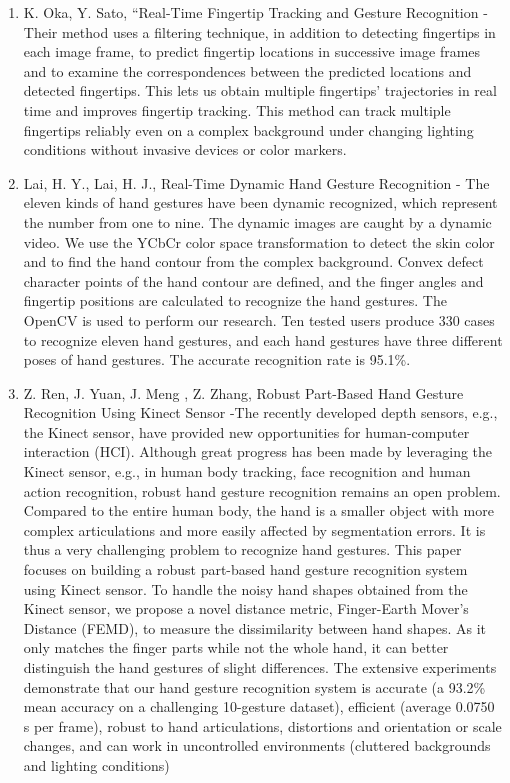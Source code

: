 \documentclass[11pt]{report}
\begin{document}
\begin{enumerate}
    \item K. Oka, Y. Sato, “Real-Time Fingertip Tracking and Gesture Recognition - Their method uses a filtering technique, in addition to detecting fingertips  in  each  image  frame,  to predict fingertip locations in successive image frames and to examine the correspondences between the predicted locations and detected fingertips. This lets us obtain multiple fingertips’ trajectories in real time and improves fingertip tracking. This method can track multiple fingertips reliably even on a complex background under changing lighting conditions without invasive devices or color markers. \cite{1}
    
    \item Lai, H. Y., Lai, H. J., Real-Time Dynamic Hand Gesture Recognition - The  eleven  kinds  of  hand  gestures have  been  dynamic  recognized,  which  represent  the  number from  one  to  nine.  The  dynamic  images  are  caught  by  a  dynamic video.  We  use  the  YCbCr  color  space  transformation  to  detect the  skin  color  and  to  find  the  hand  contour from  the  complex background. Convex defect character points of the hand contour are  defined,  and  the  finger  angles  and  fingertip  positions  are calculated to recognize the hand gestures. The OpenCV is used to perform our research. Ten tested users produce 330 cases to recognize  eleven  hand  gestures,  and  each  hand  gestures  have  three different poses of hand gestures.  The accurate recognition rate is 95.1\%.\cite{2}

    \item Z. Ren, J. Yuan, J. Meng , Z. Zhang, Robust Part-Based Hand Gesture Recognition Using Kinect Sensor -The recently developed depth sensors, e.g., the Kinect sensor, have provided new opportunities for human-computer interaction (HCI). Although great progress has been made by leveraging the Kinect sensor, e.g., in human body tracking, face recognition and human action recognition, robust hand gesture recognition remains an open problem. Compared to the entire human body, the hand is a smaller object with more complex articulations and more easily affected by segmentation errors. It is thus a very challenging problem to recognize hand gestures. This paper focuses on building a robust part-based hand gesture recognition system using Kinect sensor. To handle the noisy hand shapes obtained from the Kinect sensor, we propose a novel distance metric, Finger-Earth Mover's Distance (FEMD), to measure the dissimilarity between hand shapes. As it only matches the finger parts while not the whole hand, it can better distinguish the hand gestures of slight differences. The extensive experiments demonstrate that our hand gesture recognition system is accurate (a 93.2\% mean accuracy on a challenging 10-gesture dataset), efficient (average 0.0750 s per frame), robust to hand articulations, distortions and orientation or scale changes, and can work in uncontrolled environments (cluttered backgrounds and lighting conditions) \cite{3}
    

\end{enumerate}
\end{document}
